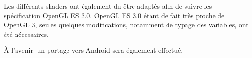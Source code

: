\documentclass[10pt,a4paper,twoside, twocolumn]{report}
\newcommand*{\rootPath}{../}
\begin{document}
Les différents shaders ont également du être adaptés afin de suivre les spécification OpenGL ES $3.0$. OpenGL ES $3.0$ étant de fait très proche de OpenGL $3$, seules quelques modifications, notamment de typage des variables, ont été nécessaires.

À l'avenir, un portage vers Android sera également effectué.

\ifstandalone
	
	
\fi
\end{document}
